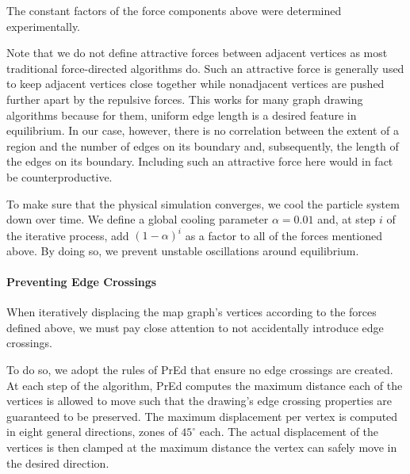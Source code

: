 The constant factors of the force components above were determined experimentally.

Note that we do not define attractive forces between adjacent vertices as most traditional force-directed algorithms do. Such an attractive force is generally used to keep adjacent vertices close together while nonadjacent vertices are pushed further apart by the repulsive forces. This works for many graph drawing algorithms because for them, uniform edge length is a desired feature in equilibrium. In our case, however, there is no correlation between the extent of a region and the number of edges on its boundary and, subsequently, the length of the edges on its boundary. Including such an attractive force here would in fact be counterproductive.

To make sure that the physical simulation converges, we cool the particle system down over time. We define a global cooling parameter $\alpha = 0.01$ and, at step $i$ of the iterative process, add $(1 - \alpha)^i$ as a factor to all of the forces mentioned above. By doing so, we prevent unstable oscillations around equilibrium.



\paragraph{Preventing Edge Crossings}

When iteratively displacing the map graph's vertices according to the forces defined above, we must pay close attention to not accidentally introduce edge crossings.

To do so, we adopt the rules of PrEd \cite{bertault1999force} that ensure no edge crossings are created. At each step of the algorithm, PrEd computes the maximum distance each of the vertices is allowed to move such that the drawing's edge crossing properties are guaranteed to be preserved. The maximum displacement per vertex is computed in eight general directions, zones of $45^\circ$ each. The actual displacement of the vertices is then clamped at the maximum distance the vertex can safely move in the desired direction.
